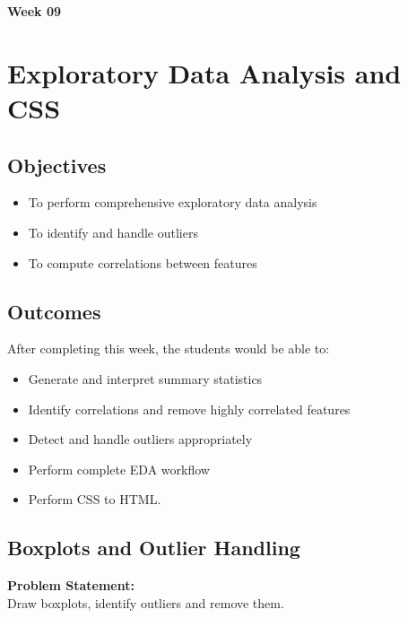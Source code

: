 \documentclass[a4paper,12pt]{article}
\begin{document}
\begin{center}
    \vspace*{1cm}
    {\Huge \textbf{Week 09}} \\
    \vspace{0.5cm}
    \vspace{1cm}
\end{center}

\section{Exploratory Data Analysis and CSS}

\subsection*{Objectives}
\begin{itemize}
    \item To perform comprehensive exploratory data analysis
    \item To identify and handle outliers
    \item To compute correlations between features
\end{itemize}

\subsection*{Outcomes}
After completing this week, the students would be able to:
\begin{itemize}
    \item Generate and interpret summary statistics
    \item Identify correlations and remove highly correlated features
    \item Detect and handle outliers appropriately
    \item Perform complete EDA workflow
    \item Perform CSS to HTML.
\end{itemize}

\subsection{Boxplots and Outlier Handling}
\textbf{Problem Statement:} \\
Draw boxplots, identify outliers and remove them.
\end{document}
